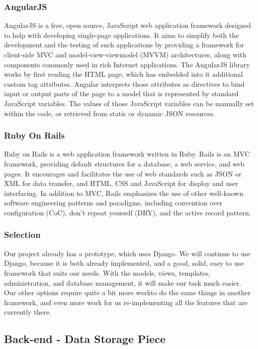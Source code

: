 \documentclass[draftclsnofoot,10pt,onecolumn]{IEEEtran} %
\begin{document}
\subsubsection{AngularJS}
AngularJS is a free, open source, JavaScript web application framework designed to help with developing single-page
applications. It aims to simplify both the development and the testing of such applications by providing a framework for
client-side MVC and model-view-viewmodel (MVVM) architectures, along with components commonly used in rich Internet
applications. The AngularJS library works by first reading the HTML page, which has embedded into it additional custom tag
attributes. Angular interprets those attributes as directives to bind input or output parts of the page to a model that is
represented by standard JavaScript variables. The values of those JavaScript variables can be manually set within the code, or
retrieved from static or dynamic JSON resources.\\

\subsubsection{Ruby On Rails}
Ruby on Rails is a web application framework written in Ruby. Rails is an MVC framework, providing default structures for
a database, a web service, and web pages. It encourages and facilitates the use of web standards such as JSON or XML for
data transfer, and HTML, CSS and JavaScript for display and user interfacing. In addition to MVC, Rails emphasizes the use
of other well-known software engineering patterns and paradigms, including convention over configuration (CoC), don't
repeat yourself (DRY), and the active record pattern. \\

\subsubsection{Selection}
Our project already has a prototype, which uses Django. We will continue to use Django, because it is both already
implemented, and a good, solid, easy to use framework that suits our needs. With the models, views, templates,
administration, and database management, it will make our task much easier. Our other options require quite a bit more workto do the same things in another framework, and even more work for us re-implementing all the features that are currently
there. 

\subsection{Back-end - Data Storage Piece}
\end{document}
